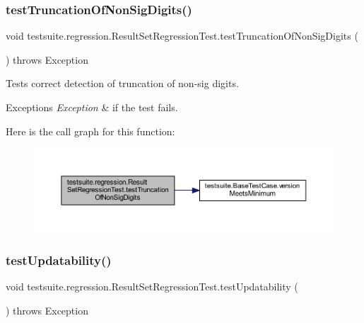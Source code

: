\subsubsection{\texorpdfstring{test\+Truncation\+Of\+Non\+Sig\+Digits()}{testTruncationOfNonSigDigits()}}
{\footnotesize\ttfamily void testsuite.\+regression.\+Result\+Set\+Regression\+Test.\+test\+Truncation\+Of\+Non\+Sig\+Digits (\begin{DoxyParamCaption}{ }\end{DoxyParamCaption}) throws Exception}

Tests correct detection of truncation of non-\/sig digits.


\begin{DoxyExceptions}{Exceptions}
{\em Exception} & if the test fails. \\
\hline
\end{DoxyExceptions}
Here is the call graph for this function\+:
\nopagebreak
\begin{figure}[H]
\begin{center}
\leavevmode
\includegraphics[width=350pt]{classtestsuite_1_1regression_1_1_result_set_regression_test_ab795cff973063bdb983542cffb1c54cd_cgraph}
\end{center}
\end{figure}
\mbox{\label{classtestsuite_1_1regression_1_1_result_set_regression_test_aee16c849b12feacaadefbdb6c6eb2052}} 
\subsubsection{\texorpdfstring{test\+Updatability()}{testUpdatability()}}
{\footnotesize\ttfamily void testsuite.\+regression.\+Result\+Set\+Regression\+Test.\+test\+Updatability (\begin{DoxyParamCaption}{ }\end{DoxyParamCaption}) throws Exception}

